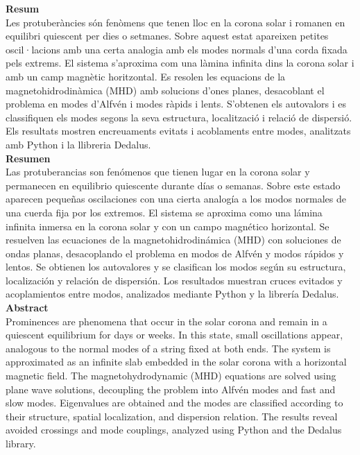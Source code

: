 \documentclass[11pt, a4paper, oneside]{book}
\numberwithin{equation}{section}
\begin{document}
\thispagestyle{footer}
\newpage
\thispagestyle{empty}
\mbox{}
\newpage
\selectfont
     \noindent\Large{\sffamily\textbf{Resum}}\\[-1.25em]

    \normalsize{Les protuberàncies són fenòmens que tenen lloc en la corona solar i romanen en equilibri quiescent per dies o setmanes.
    Sobre aquest estat apareixen petites oscil·lacions amb una certa analogia amb els modes normals d'una corda fixada pels extrems.
    El sistema s'aproxima com una làmina infinita dins la corona solar i amb un camp magnètic horitzontal.
    Es resolen les equacions de la magnetohidrodinàmica (MHD) amb solucions d'ones planes, desacoblant el problema en modes d'Alfvén i modes ràpids i lents.
    S'obtenen els autovalors i es classifiquen els modes segons la seva estructura, localització i relació de dispersió.
    Els resultats mostren encreuaments evitats i acoblaments entre modes, analitzats amb Python i la llibreria Dedalus.}\\[-0.25em]
    
    \noindent\Large{\sffamily\textbf{Resumen}}\\[-1.25em]

    
    \normalsize{Las protuberancias son fenómenos que tienen lugar en la corona solar y permanecen en equilibrio quiescente durante días o semanas.
    Sobre este estado aparecen pequeñas oscilaciones con una cierta analogía a los modos normales de una cuerda fija por los extremos.
    El sistema se aproxima como una lámina infinita inmersa en la corona solar y con un campo magnético horizontal.
    Se resuelven las ecuaciones de la magnetohidrodinámica (MHD) con soluciones de ondas planas, desacoplando el problema en modos de Alfvén y modos rápidos y lentos.
    Se obtienen los autovalores y se clasifican los modos según su estructura, localización y relación de dispersión.
    Los resultados muestran cruces evitados y acoplamientos entre modos, analizados mediante Python y la librería Dedalus.} \\[-0.25em]
    
    \noindent\Large{\sffamily\textbf{Abstract}}\\[-1.25em]

    
    \normalsize{Prominences are phenomena that occur in the solar corona and remain in a quiescent equilibrium for days or weeks.
    In this state, small oscillations appear, analogous to the normal modes of a string fixed at both ends.
    The system is approximated as an infinite slab embedded in the solar corona with a horizontal magnetic field.
    The magnetohydrodynamic (MHD) equations are solved using plane wave solutions, decoupling the problem into Alfvén modes and fast and slow modes.
    Eigenvalues are obtained and the modes are classified according to their structure, spatial localization, and dispersion relation.
    The results reveal avoided crossings and mode couplings, analyzed using Python and the Dedalus library.}\\
\end{document}
